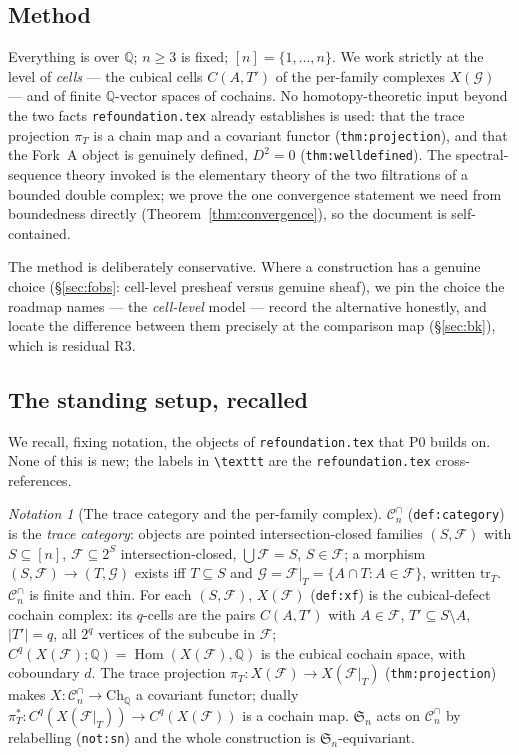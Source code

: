 \documentclass[11pt,oneside]{amsart}
\theoremstyle{plain}
\theoremstyle{definition}
\theoremstyle{remark}
\newtheorem{notation}[theorem]{Notation}
\theoremstyle{honeststyle}
\newcommand{\F}{\mathcal{F}}
\newcommand{\G}{\mathcal{G}}
\newcommand{\Sym}{\mathfrak{S}}
\newcommand{\Q}{\mathbb{Q}}
\newcommand{\Cn}{\mathcal{C}^{\cap}_n}
\newcommand{\tr}{\mathrm{tr}}
\newcommand{\Ch}{\mathrm{Ch}}
\DeclareMathOperator{\Hom}{Hom}
\begin{document}
\subsection{Method}
\label{ssec:method}

Everything is over $\Q$; $n\ge3$ is fixed; $[n]=\{1,\dots,n\}$. We
work strictly at the level of \emph{cells} --- the cubical cells
$C(A,T')$ of the per-family complexes $X(\G)$ --- and of finite
$\Q$-vector spaces of cochains. No homotopy-theoretic input beyond the
two facts \texttt{refoundation.tex} already establishes is used: that
the trace projection $\pi_{T}$ is a chain map and a covariant functor
(\texttt{thm:projection}), and that the Fork~A object is genuinely
defined, $D^{2}=0$ (\texttt{thm:welldefined}). The spectral-sequence
theory invoked is the elementary theory of the two filtrations of a
bounded double complex; we prove the one convergence statement we need
from boundedness directly (Theorem~\ref{thm:convergence}), so the
document is self-contained.

The method is deliberately conservative. Where a construction has a
genuine choice (\S\ref{sec:fobs}: cell-level presheaf versus genuine
sheaf), we pin the choice the roadmap names --- the \emph{cell-level}
model --- record the alternative honestly, and locate the difference
between them precisely at the comparison map (\S\ref{sec:bk}), which is
residual R3.

\subsection{The standing setup, recalled}
\label{ssec:setup}

We recall, fixing notation, the objects of \texttt{refoundation.tex}
that P0 builds on. None of this is new; the labels in
\texttt{\textbackslash texttt} are the \texttt{refoundation.tex} cross-references.

\begin{notation}[The trace category and the per-family complex]
\label{not:standing}
$\Cn$ (\texttt{def:category}) is the \emph{trace category}: objects
are pointed intersection-closed families $(S,\F)$ with
$S\subseteq[n]$, $\F\subseteq2^{S}$ intersection-closed,
$\bigcup\F=S$, $S\in\F$; a morphism $(S,\F)\to(T,\G)$ exists iff
$T\subseteq S$ and $\G=\F|_{T}=\{A\cap T:A\in\F\}$, written $\tr_{T}$.
$\Cn$ is finite and thin. For each $(S,\F)$, $X(\F)$
(\texttt{def:xf}) is the cubical-defect cochain complex: its $q$-cells
are the pairs $C(A,T')$ with $A\in\F$, $T'\subseteq S\setminus A$,
$|T'|=q$, all $2^{q}$ vertices of the subcube in $\F$; $C^{q}(X(\F);\Q)
=\Hom(X(\F),\Q)$ is the cubical cochain space, with coboundary $d$.
The trace projection $\pi_{T}\colon X(\F)\to X(\F|_{T})$
(\texttt{thm:projection}) makes $X\colon\Cn\to\Ch_{\Q}$ a covariant
functor; dually $\pi_{T}^{*}\colon C^{q}(X(\F|_{T}))\to C^{q}(X(\F))$
is a cochain map. $\Sym_{n}$ acts on $\Cn$ by relabelling
(\texttt{not:sn}) and the whole construction is $\Sym_{n}$-equivariant.
\end{notation}
\end{document}

